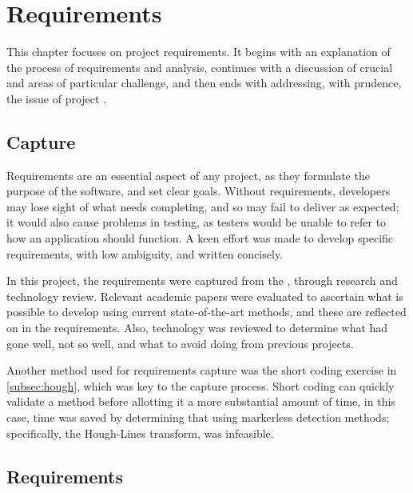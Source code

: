 
\chapter{Requirements}\label{chap:requirements}

This chapter focuses on project requirements. It begins with an explanation of the process of requirements  and analysis, continues with a discussion of crucial  and areas of particular challenge, and then ends with addressing, with prudence, the issue of project .

\section{Capture} \label{sec:requirementscapture}

Requirements are an essential aspect of any project, as they formulate the purpose of the software, and set clear goals. Without requirements, developers may lose sight of what needs completing, and so may fail to deliver as expected; it would also cause problems in testing, as testers would be unable to refer to how an application should function. A keen effort was made to develop specific requirements, with low ambiguity, and written concisely.

In this project, the requirements were captured from the , through research and technology review. Relevant academic papers were evaluated to ascertain what is possible to develop using current state-of-the-art methods, and these are reflected on in the requirements. Also, technology was reviewed to determine what had gone well, not so well, and what to avoid doing from previous projects.

Another method used for requirements capture was the short coding exercise in \cref{subsec:hough}, which was key to the capture process. Short coding can quickly validate a method before allotting it a more substantial amount of time, in this case, time was saved by determining that using markerless detection methods; specifically, the Hough-Lines transform, was infeasible.

\section{Requirements} \label{sec:requirements}

